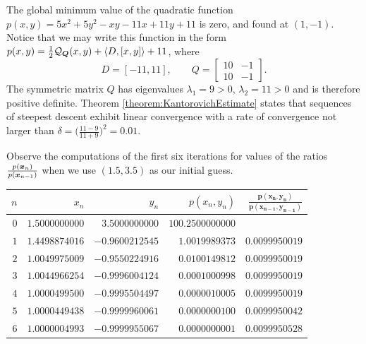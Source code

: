 \begin{example}\label{example:SDconvergenceRate}
The global minimum value of the quadratic function $p(x,y) = 5x^2 + 5y^2 -xy -11x +11y +11$ is zero, and found at $(1,-1)$.  Notice that we may write this function in the form $p(x,y) = \tfrac{1}{2}\mathcal{Q}_{\boldsymbol{Q}}(x,y) + \langle D, [x,y] \rangle + 11$, where
\begin{equation*}
D = [ -11, 11], \qquad Q = \begin{bmatrix} 10 & -1 \\ 10 & -1 \end{bmatrix}.
\end{equation*}
The symmetric matrix $Q$ has eigenvalues $\lambda_1 = 9 >0$, $\lambda_2 = 11 > 0$ and is therefore positive definite.  Theorem \ref{theorem:KantorovichEstimate} states that sequences of steepest descent exhibit linear convergence with a rate of convergence not larger than $\delta = \big( \tfrac{11-9}{11+9} \big)^2 = 0.01$.

Observe the computations of the first six iterations for values of the ratios $\frac{p(\boldsymbol{x}_n)}{p(\boldsymbol{x}_{n-1})}$ when we use $(1.5,3.5)$ as our initial guess.
\begin{center}
\begin{tabular}{|r|r|r|r|r|} \hline 
 $n$ & $x_n$ & $y_n$ & $p(x_n,y_n)$ & $\boldsymbol{\frac{p(x_n,y_n)}{p(x_{n-1},y_{n-1})}}$ \\ \hline \hline 
$0$ & $1.5000000000$ & $3.5000000000$ & $100.2500000000$ &  \\ \hline 
$1$ & $1.4498874016$ & $-0.9600212545$ & $1.0019989373$ & $\boldsymbol{0.0099950019}$ \\ \hline 
$2$ & $1.0049975009$ & $-0.9550224916$ & $0.0100149812$ & $\boldsymbol{0.0099950019}$ \\ \hline 
$3$ & $1.0044966254$ & $-0.9996004124$ & $0.0001000998$ & $\boldsymbol{0.0099950019}$ \\ \hline 
$4$ & $1.0000499500$ & $-0.9995504497$ & $0.0000010005$ & $\boldsymbol{0.0099950019}$ \\ \hline 
$5$ & $1.0000449438$ & $-0.9999960061$ & $0.0000000100$ & $\boldsymbol{0.0099950042}$ \\ \hline 
$6$ & $1.0000004993$ & $-0.9999955067$ & $0.0000000001$ & $\boldsymbol{0.0099950528}$ \\ \hline 
\end{tabular}
\end{center}
\end{example}
